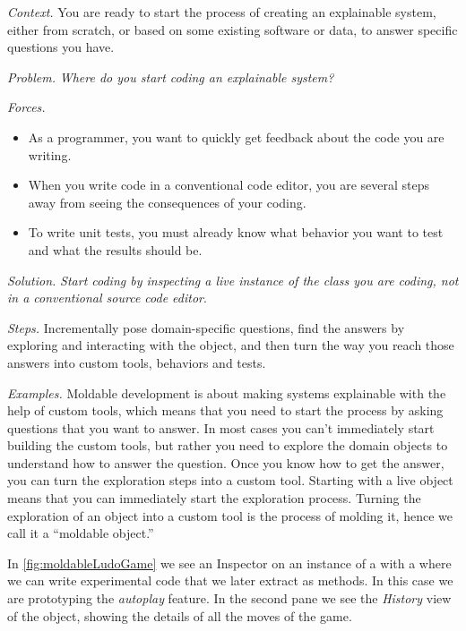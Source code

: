 \documentclass[acmsmall,screen,authorversion,nonacm]{acmart} %
\newcommand\cp[1]{\nbe{Cesare}{#1}{olive}} %
\newcommand{\patref}[1]{\emph{\nameref{pat:#1}}\xspace}
\newcommand{\patsec}[1]{\noindent\textit{#1.}\xspace}
\begin{document}
\patsec{Context}
You are ready to start the process of creating an explainable system, either from scratch, or based on some existing software or data, to answer specific questions you have.

\patsec{Problem}
\emph{Where do you start coding an explainable system?}

\patsec{Forces}
\begin{itemize}[---]
\item As a programmer, you want to quickly get feedback about the code you are writing.
\item When you write code in a conventional code editor, you are several steps away from seeing the consequences of your coding.
\item To write unit tests, you must already know what behavior you want to test and what the results should be.
\end{itemize}

\patsec{Solution}
\emph{Start coding by inspecting a live instance of the class you are coding, not in a conventional source code editor}.

\patsec{Steps}
Incrementally pose domain-specific questions, find the answers by exploring and interacting with the object, and then turn the way you reach those answers into custom tools, behaviors and tests.

\patsec{Examples}
Moldable development is about making systems explainable with the help of custom tools, which means that you need to start the process by asking questions that you want to answer.
In most cases you can't immediately start building the custom tools, but rather you need to explore the domain objects to understand how to answer the question.
Once you know how to get the answer, you can turn the exploration steps into a custom tool.
Starting with a live object means that you can immediately start the exploration process.
Turning the exploration of an object into a custom tool is the process of molding it, hence we call it a ``moldable object.''

In \autoref{fig:moldableLudoGame} we see an Inspector on an instance of a  with a \patref{ContextualPlayground} where we can write experimental code that we later extract as methods.
In this case we are prototyping the \emph{autoplay} feature.
In the second pane we see the \emph{History} view of the object, showing the details of all the moves of the game.
\end{document}
